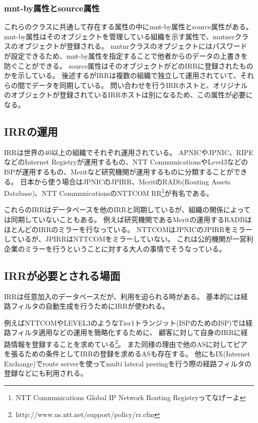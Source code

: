 \subsubsection{mnt-by属性とsource属性}
これらのクラスに共通して存在する属性の中にmnt-by属性とsource属性がある。
mnt-by属性はそのオブジェクトを管理している組織を示す属性で、mntnerクラスのオブジェクトが登録される。
mntnrクラスのオブジェクトにはパスワードが設定できるため、mnt-by属性を指定することで他者からのデータの上書きを防ぐことができる。
source属性はそのオブジェクトがどのIRRに登録されたものかを示している。
後述するがIRRは複数の組織で独立して運用されていて、それらの間でデータを同期している。
問い合わせを行うIRRホストと、オリジナルのオブジェクトが登録されているIRRホストは別になるため、この属性が必要になる。

\subsection{IRRの運用}

IRRは世界の40以上の組織でそれぞれ運用されている。
APNICやJPNIC、RIPEなどのInternet Registryが運用するもの、NTT CommunicationsやLevel3などのISPが運用するもの、Meritなど研究機関が運用するものに分類することができる。
日本から使う場合はJPNICのJPIRR、MeritのRADb(Routing Assets Database)、NTT CommunicationsのNTTCOM RR\footnote{NTT Communications Global IP Network Routing Registryってなげーよ}が有名である。

これらのIRRはデータベースを他のIRRと同期しているが、組織の関係によっては同期していないこともある。
例えば研究機関であるMeritの運用するRADBはほとんどのIRRのミラーを行なっている。
NTTCOMはJPNICのJPIRRをミラーしているが、JPIRRはNTTCOMをミラーしていない。
これは公的機関が一営利企業のミラーを行うということに対する大人の事情でそうなっている。

\subsection{IRRが必要とされる場面}

IRRは任意加入のデータベースだが、利用を迫られる時がある。
基本的には経路フィルタの自動生成を行うためにIRRが使われる。

例えばNTTCOMやLEVEL3のようなTier1トランジット(ISPのためのISP)では経路フィルタ適用などの運用を簡略化するために、
顧客に対して自身のIRRに経路情報を登録することを求めている\footnote{http://www.us.ntt.net/support/policy/rr.cfm}。
また同様の理由で他のASに対してピアを張るための条件としてIRRの登録を求めるASも存在する。
他にもIX(Internet Exchange)でroute serverを使ってmulti lateral peeringを行う際の経路フィルタの登録などにも利用される。

